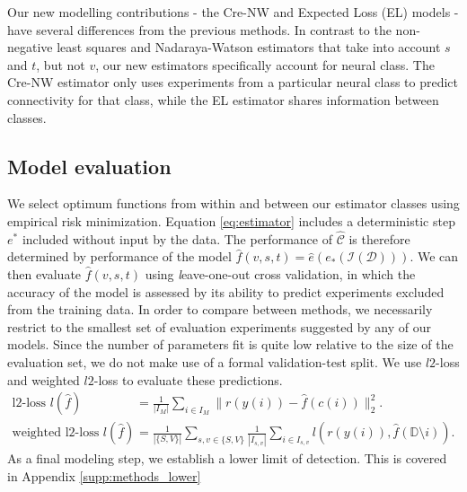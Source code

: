 Our new modelling contributions - the Cre-NW and Expected Loss (EL) models - have several differences from the previous methods.
In contrast to the \citet{Oh2014-kh} non-negative least squares and \citet{Knox2019-ot} Nadaraya-Watson estimators that take into account $s$ and $t$, but not $v$, our new estimators specifically account for neural class.
The Cre-NW estimator only uses experiments from a particular neural class to predict connectivity for that class, while the EL estimator shares information between classes.



\newpage

\subsection{Model evaluation}

We select optimum functions from within and between our estimator classes using empirical risk minimization.
Equation \ref{eq:estimator}  includes a deterministic step $e^*$ included without input by the data.
The performance of $\widehat {\mathcal C}$ is therefore determined by performance of the model $\widehat f(v,s,t) = \widehat e (e_*(\mathcal{I} (\mathcal D)))$.
We can then evaluate $\widehat f(v,s,t)$ using {\textit leave-one-out cross validation}, in which the accuracy of the model is assessed by its ability to predict experiments excluded from the training data.
In order to compare between methods, we necessarily restrict to the smallest set of evaluation experiments suggested by any of our models.
Since the number of parameters fit is quite low relative to the size of the evaluation set, we do not make use of a formal validation-test split.
We use $l2$-loss and weighted $l2$-loss to evaluate these predictions.
\begin{align*}
\text{l2-loss } l ( \hat f) &= \frac{1}{|I_M|} \sum_{i \in I_M} \| r(y(i)) - \hat f(c(i)) \|_2^2. \\
\text{weighted l2-loss } l ( \hat f) &= \frac{1}{|\{S,V\}|} \sum_{s,v \in \{S,V\}} \frac{1}{ |I_{s,v}|} \sum_{i \in I_{s,v} } l(r(y(i)), \hat f(\mathbb D \setminus i)) .
\end{align*}
As a final modeling step, we establish a lower limit of detection.
This is covered in Appendix \ref{supp:methods_lower}

